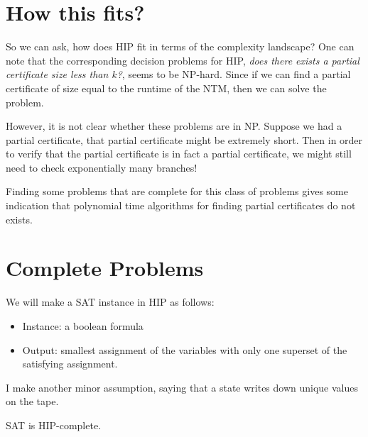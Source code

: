 \documentclass[runningheads,a4paper]{llncs}
\begin{document}
\section{How this fits?}

So we can ask, how does HIP fit in terms of the complexity landscape? One can note that the corresponding decision problems for HIP, \emph{does there exists a partial certificate size less than $k$?}, seems to be NP-hard. Since if we can find a partial certificate of size equal to the runtime of the NTM, then we can solve the problem.

However, it is not clear whether these problems are in NP. Suppose we had a partial certificate, that partial certificate might be extremely short. Then in order to verify that the partial certificate is in fact a partial certificate, we might still need to check exponentially many branches!

Finding some problems that are complete for this class of problems gives some indication that polynomial time algorithms for finding partial certificates do not exists.

\section{Complete Problems}

We will make a SAT instance in HIP as follows:
\begin{itemize}
\item Instance: a boolean formula
\item Output: smallest assignment of the variables with only one superset of the satisfying assignment.
\end{itemize}

I make another minor assumption, saying that a state writes down unique values on the tape. 

\begin{theorem}
SAT is HIP-complete.
\end{theorem}
\end{document}
